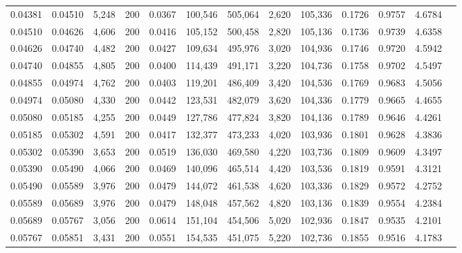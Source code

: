 \begin{tabular}{rrrrrrrrrrrrr}
0.04381 & 0.04510 &  5,248 & 200 &                                     0.0367 & 100,546 & 505,064 &   2,620 & 105,336 & 0.1726 & 0.9757 & 4.6784 \\
0.04510 & 0.04626 &  4,606 & 200 &                                     0.0416 & 105,152 & 500,458 &   2,820 & 105,136 & 0.1736 & 0.9739 & 4.6358 \\
0.04626 & 0.04740 &  4,482 & 200 &                                     0.0427 & 109,634 & 495,976 &   3,020 & 104,936 & 0.1746 & 0.9720 & 4.5942 \\
0.04740 & 0.04855 &  4,805 & 200 &                                     0.0400 & 114,439 & 491,171 &   3,220 & 104,736 & 0.1758 & 0.9702 & 4.5497 \\
0.04855 & 0.04974 &  4,762 & 200 &                                     0.0403 & 119,201 & 486,409 &   3,420 & 104,536 & 0.1769 & 0.9683 & 4.5056 \\
0.04974 & 0.05080 &  4,330 & 200 &                                     0.0442 & 123,531 & 482,079 &   3,620 & 104,336 & 0.1779 & 0.9665 & 4.4655 \\
0.05080 & 0.05185 &  4,255 & 200 &                                     0.0449 & 127,786 & 477,824 &   3,820 & 104,136 & 0.1789 & 0.9646 & 4.4261 \\
0.05185 & 0.05302 &  4,591 & 200 &                                     0.0417 & 132,377 & 473,233 &   4,020 & 103,936 & 0.1801 & 0.9628 & 4.3836 \\
0.05302 & 0.05390 &  3,653 & 200 &                                     0.0519 & 136,030 & 469,580 &   4,220 & 103,736 & 0.1809 & 0.9609 & 4.3497 \\
0.05390 & 0.05490 &  4,066 & 200 &                                     0.0469 & 140,096 & 465,514 &   4,420 & 103,536 & 0.1819 & 0.9591 & 4.3121 \\
0.05490 & 0.05589 &  3,976 & 200 &                                     0.0479 & 144,072 & 461,538 &   4,620 & 103,336 & 0.1829 & 0.9572 & 4.2752 \\
0.05589 & 0.05689 &  3,976 & 200 &                                     0.0479 & 148,048 & 457,562 &   4,820 & 103,136 & 0.1839 & 0.9554 & 4.2384 \\
0.05689 & 0.05767 &  3,056 & 200 &                                     0.0614 & 151,104 & 454,506 &   5,020 & 102,936 & 0.1847 & 0.9535 & 4.2101 \\
0.05767 & 0.05851 &  3,431 & 200 &                                     0.0551 & 154,535 & 451,075 &   5,220 & 102,736 & 0.1855 & 0.9516 & 4.1783 \\

\end{tabular}
